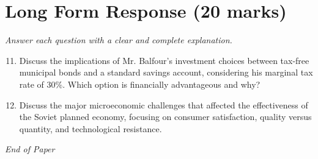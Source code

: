 \documentclass[12pt]{article}
\begin{document}
\section*{Long Form Response (20 marks)}
\textit{Answer each question with a clear and complete explanation.}
\begin{enumerate}[label=\arabic*.]
\setcounter{enumi}{10}
\item Discuss the implications of Mr. Balfour's investment choices between tax-free municipal bonds and a standard savings account, considering his marginal tax rate of 30\%. Which option is financially advantageous and why?
\item Discuss the major microeconomic challenges that affected the effectiveness of the Soviet planned economy, focusing on consumer satisfaction, quality versus quantity, and technological resistance.
\end{enumerate}

\vfill
\noindent\textit{End of Paper}
\end{document}
